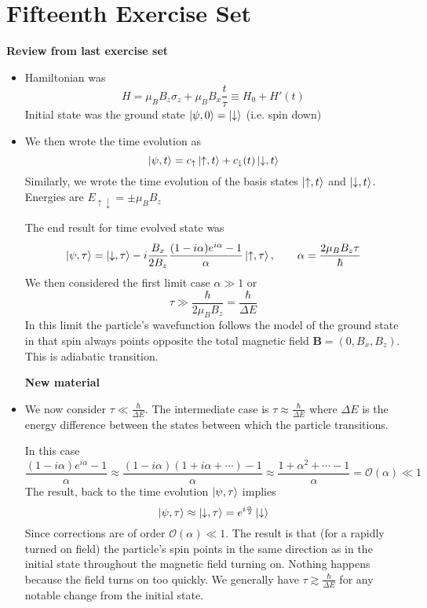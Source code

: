 \documentclass[11pt, a4paper]{article}
\newcommand{\Ham}{Hamiltonian\xspace}
\renewcommand{\vec}[1]{\bm{#1}} %
\newcommand{\p}{\psi}  %
\newcommand{\ua}{\uparrow}  %
\newcommand{\da}{\downarrow}  %
\begin{document}
\section{Fifteenth Exercise Set}

\textbf{Review from last exercise set}
\begin{itemize}
	\item \Ham was
	\begin{equation*}
		H = \mu_{B} B_{z}\sigma_{z} + \mu_{B}B_{x}\frac{t}{\tau} \equiv H_{0} + H'(t)
	\end{equation*}
	Initial state was the ground state $ \ket{\p, 0} = \ket{\da} $ (i.e. spin down)
	
	\item We then wrote the time evolution as
	\begin{equation*}
		\ket{\p, t} = c_{\ua}\ket{\ua, t} + c_{\da}(t)\ket{\da, t}
	\end{equation*}
	Similarly, we wrote the time evolution of the basis states $ \ket{\ua, t} $ and $ \ket{\da, t} $. Energies are $ E_{\ua \da} = \pm \mu_{B}B_{z}$
	
	The end result for time evolved state was
	\begin{equation*}
		\ket{\p, \tau} = \ket{\da, \tau}-i\frac{B_{x}}{2B_{z}} \frac{(1 - i\alpha)e^{i\alpha} - 1}{\alpha}\ket{\ua, \tau}, \qquad \alpha = \frac{2\mu_{B}B_{z}\tau}{\hbar}
	\end{equation*}
	We then considered the first limit case $ \alpha \gg 1 $ or 
	\begin{equation*}
		\tau \gg \frac{\hbar}{2\mu_{B}B_{z}} = \frac{\hbar}{\Delta E}
	\end{equation*}
	In this limit the particle's wavefunction follows the model of the ground state in that spin always points opposite the total magnetic field $ \vec{B} = (0, B_{x}, B_{z}) $. This is adiabatic transition.
	
	\textbf{New material}
	\item We now consider $ \tau \ll \frac{\hbar}{\Delta E} $. The intermediate case is $ \tau \approx \frac{\hbar}{\Delta E} $ where $ \Delta E $ is the energy difference between the states between which the particle transitions.
	
	In this case
	\begin{equation*}
		\frac{(1 - i\alpha)e^{i\alpha} - 1}{\alpha} \approx \frac{(1 - i \alpha)(1 + i \alpha + \cdots) - 1}{\alpha} \approx \frac{1 + \alpha^{2} + \cdots - 1}{\alpha} = \mathcal{O}(\alpha) \ll 1
	\end{equation*}
	The result, back to the time evolution $ \ket{\p, \tau} $ implies
	\begin{equation*}
		\ket{\p, \tau} \approx \ket{\da, \tau} = e^{i\frac{\alpha}{2}}\ket{\da}
	\end{equation*}
	Since corrections are of order $ \mathcal{O}(\alpha) \ll 1 $. The result is that (for a rapidly turned on field) the particle's spin points in the same direction as in the initial state throughout the magnetic field turning on. Nothing happens because the field turns on too quickly. We generally have $ \tau \gtrsim \frac{\hbar}{\Delta E} $ for any notable change from the initial state.
\end{itemize}
\end{document}
